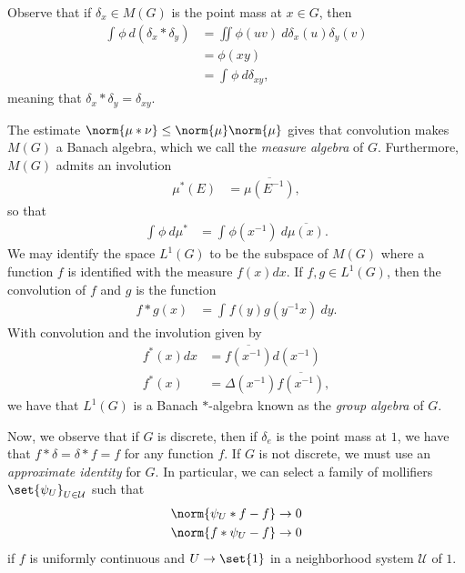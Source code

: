 \documentclass[12pt]{mypackage}
\begin{document}
Observe that if $\delta_x\in M(G)$ is the point mass at $x\in G$, then
\begin{align*}
  \int_{}^{} \phi\:d\left( \delta_x\ast\delta_y \right) &= \iint \phi(uv)\:d\delta_x(u)\delta_y(v)\\
                                                        &= \phi(xy)\\
                                                        &= \int_{}^{} \phi\:d\delta_{xy},
\end{align*}
meaning that $\delta_x\ast\delta_y = \delta_{xy}$.

The estimate $\norm{\mu\ast\nu}\leq \norm{\mu}\norm{\mu}$ gives that convolution makes $M(G)$ a Banach algebra, which we call the \textit{measure algebra} of $G$. Furthermore, $M(G)$ admits an involution
\begin{align*}
  \mu^{\ast}\left( E \right) &= \overline{\mu\left( E^{-1} \right)},
\end{align*}
so that
\begin{align*}
  \int_{}^{} \phi\:d\mu^{\ast} &= \int_{}^{} \phi\left( x^{-1} \right)\:d \overline{\mu(x)}.
\end{align*}
We may identify the space $L^1(G)$ to be the subspace of $M(G)$ where a function $f$ is identified with the measure $f(x)dx$. If $f,g\in L^1(G)$, then the convolution of $f$ and $g$ is the function
\begin{align*}
  f\ast g(x) &= \int_{}^{} f(y)g\left( y^{-1}x \right)\:dy.
\end{align*}
With convolution and the involution given by
\begin{align*}
  f^{\ast}(x)dx &= \overline{f\left( x^{-1} \right)}d\left( x^{-1} \right)\\
  f^{\ast}(x)&= \Delta\left( x^{-1} \right) \overline{f\left( x^{-1} \right)},
\end{align*}
we have that $L^1(G)$ is a Banach $\ast$-algebra known as the \textit{group algebra} of $G$.

Now, we observe that if $G$ is discrete, then if $\delta_e$ is the point mass at $1$, we have that $f\ast\delta = \delta\ast f = f$ for any function $f$. If $G$ is not discrete, we must use an \textit{approximate identity} for $G$. In particular, we can select a family of mollifiers $\set{\psi_U}_{U\in \mathcal{U}}$ such that
\begin{align*}
  \norm{\psi_U\ast f - f} &\rightarrow 0\\
  \norm{f\ast\psi_U - f} &\rightarrow 0
\end{align*}
if $f$ is uniformly continuous and $U\rightarrow \set{1}$ in a neighborhood system $\mathcal{U}$ of $1$.
\end{document}
